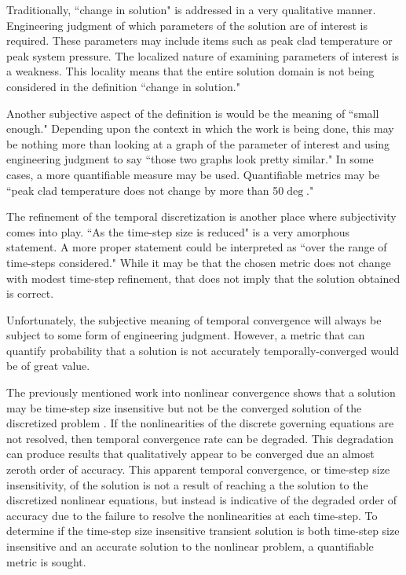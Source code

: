 Traditionally, ``change in solution" is addressed in a very qualitative manner.
Engineering judgment of which parameters of the solution are of interest is required.
These parameters may include items such as peak clad temperature or peak system pressure.
The localized nature of examining parameters of interest is a weakness.
This locality means that the entire solution domain is not being considered in the definition ``change in solution."

Another subjective aspect of the definition is would be the meaning of ``small enough."
Depending upon the context in which the work is being done, this may be nothing more than looking at a graph of the parameter of interest and using engineering judgment to say ``those two graphs look pretty similar."
In some cases, a more quantifiable measure may be used.
Quantifiable metrics may be  ``peak clad temperature does not change by more than 50$\deg$."

The refinement of the temporal discretization is another place where subjectivity comes into play.
``As the time-step size is reduced" is a very amorphous statement.
A more proper statement could be interpreted as ``over the range of time-steps considered."
While it may be that the chosen metric does not change with modest time-step refinement, that does not imply that the solution obtained is correct.

Unfortunately, the subjective meaning of temporal convergence will always be subject to some form of engineering judgment. However, a metric that can quantify probability that a solution is not accurately temporally-converged would be of great value.

The previously mentioned work into nonlinear convergence shows that a solution may be time-step size insensitive but not be the converged solution of the discretized problem \cite{Knoll2001}.
If the nonlinearities of the discrete governing equations are not resolved, then temporal convergence rate can be degraded.
This degradation can produce results that qualitatively appear to be converged due an almost zeroth order of accuracy.
This apparent temporal convergence, or time-step size insensitivity, of the solution is not a result of reaching a the solution to the discretized nonlinear equations, but instead is indicative of the degraded order of accuracy due to the failure to resolve the nonlinearities at each time-step.
To determine if the time-step size insensitive transient solution is both time-step size insensitive and an accurate solution to the nonlinear problem, a quantifiable metric is sought.

